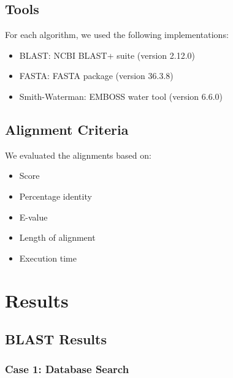 \documentclass{article}
\begin{document}
\subsection{Tools}
For each algorithm, we used the following implementations:

\begin{itemize}
    \item BLAST: NCBI BLAST+ suite (version 2.12.0)
    \item FASTA: FASTA package (version 36.3.8)
    \item Smith-Waterman: EMBOSS water tool (version 6.6.0)
\end{itemize}

\subsection{Alignment Criteria}
We evaluated the alignments based on:

\begin{itemize}
    \item Score
    \item Percentage identity
    \item E-value
    \item Length of alignment
    \item Execution time
\end{itemize}

\section{Results}

\subsection{BLAST Results}

\subsubsection{Case 1: Database Search}
\end{document}

